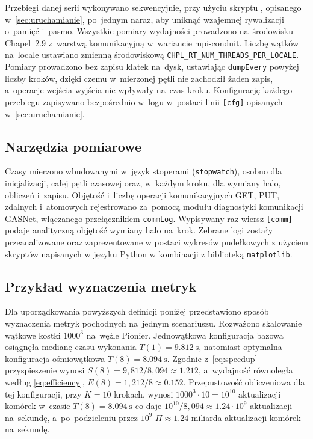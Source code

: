 Przebiegi danej serii wykonywano sekwencyjnie, przy użyciu skryptu , opisanego w~\cref{sec:uruchamianie}, po~jednym naraz, aby uniknąć wzajemnej
rywalizacji o~pamięć i~pasmo. Wszystkie pomiary wydajności prowadzono na~środowisku Chapel~2.9
z~warstwą komunikacyjną w~wariancie mpi-conduit. Liczbę wątków na~locale ustawiano zmienną
środowiskową \texttt{CHPL\_RT\_NUM\_THREADS\_PER\_LOCALE}. Pomiary prowadzono bez zapisu klatek na~dysk, ustawiając \texttt{dumpEvery} powyżej liczby kroków, dzięki czemu w~mierzonej pętli nie zachodził żaden zapis, a~operacje wejścia-wyjścia nie wpływały na~czas kroku. Konfigurację każdego przebiegu zapisywano bezpośrednio w~logu w~postaci linii
\texttt{[cfg]} opisanych w~\cref{sec:uruchamianie}.

\subsection{Narzędzia pomiarowe}

Czasy mierzono wbudowanymi w~język stoperami (\texttt{stopwatch}), osobno dla inicjalizacji, całej pętli czasowej oraz, w~każdym kroku,
dla wymiany halo, obliczeń i~zapisu. Objętość i~liczbę operacji komunikacyjnych GET, PUT, zdalnych i~atomowych rejestrowano za~pomocą modułu diagnostyki komunikacji GASNet,
włączanego przełącznikiem \texttt{commLog}. Wypisywany raz wiersz \texttt{[comm]} podaje
analityczną objętość wymiany halo na~krok.
Zebrane logi zostały przeanalizowane oraz zaprezentowane w postaci wykresów pudełkowych z użyciem
skryptów napisanych w języku Python w kombinacji z biblioteką \texttt{matplotlib}.

\subsection{Przykład wyznaczenia metryk}

Dla uporządkowania powyższych definicji poniżej przedstawiono sposób wyznaczenia metryk pochodnych na~jednym
scenariuszu. Rozważono skalowanie wątkowe kostki $1000^3$ na~węźle Pionier. Jednowątkowa
konfiguracja bazowa osiągnęła medianę czasu wykonania $T(1)=\SI{9.812}{\second}$, natomiast
optymalna konfiguracja ośmiowątkowa $T(8)=\SI{8.094}{\second}$. Zgodnie z~\eqref{eq:speedup}
przyspieszenie wynosi $S(8)=9{,}812/8{,}094\approx\num{1.212}$, a~wydajność równoległa według
\eqref{eq:efficiency}, $E(8)=1{,}212/8\approx\num{0.152}$. Przepustowość obliczeniowa dla tej konfiguracji, przy
$K=10$ krokach, wynosi $1000^3\cdot 10 = 10^{10}$ aktualizacji komórek
w~czasie $T(8)=\SI{8.094}{\second}$ co daje $10^{10}/8{,}094 \approx \num{1.24}\cdot 10^{9}$ aktualizacji
na~sekundę, a~po~podzieleniu przez $10^{9}$ $\Pi \approx \num{1.24}$ miliarda
aktualizacji komórek na~sekundę.

